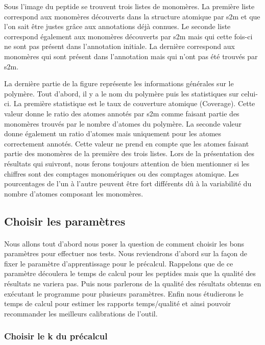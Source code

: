 \documentclass[12pt,french,twoside]{report}
\begin{document}
Sous l'image du peptide se trouvent trois listes de monomères.
La première liste correspond aux monomères découverts dans la structure atomique par s2m et que l'on sait être justes grâce aux annotations déjà connues.
Le seconde liste correspond également aux monomères découverts par s2m mais qui cette fois-ci ne sont pas présent dans l'annotation initiale.
La dernière correspond aux monomères qui sont présent dans l'annotation mais qui n'ont pas été trouvés par s2m.

La dernière partie de la figure représente les informations générales sur le polymère.
Tout d'abord, il y a le nom du polymère puis les statistiques sur celui-ci.
La première statistique est le taux de couverture atomique (Coverage).
Cette valeur donne le ratio des atomes annotés par s2m comme faisant partie des monomères trouvés par le nombre d'atomes du polymère.
La seconde valeur donne également un ratio d'atomes mais uniquement pour les atomes correctement annotés.
Cette valeur ne prend en compte que les atomes faisant partie des monomères de la première des trois listes.
Lors de la présentation des résultats qui suivront, nous ferons toujours attention de bien mentionner si les chiffres sont des comptages monomériques ou des comptages atomique.
Les pourcentages de l'un à l'autre peuvent être fort différents dû à la variabilité du nombre d'atomes composant les monomères.





\subsection{Choisir les paramètres}

\paragraph{}Nous allons tout d'abord nous poser la question de comment choisir les bons paramètres pour effectuer nos tests.
Nous reviendrons d'abord sur la façon de fixer le paramètre d'apprentissage pour le précalcul.
Rappelons que de ce paramètre découlera le temps de calcul pour les peptides mais que la qualité des résultats ne variera pas.
Puis nous parlerons de la qualité des résultats obtenus en exécutant le programme pour plusieurs paramètres.
Enfin nous étudierons le temps de calcul pour estimer les rapports temps/qualité et ainsi pouvoir recommander les meilleurs calibrations de l'outil.

\subsubsection{Choisir le k du précalcul}
\end{document}
